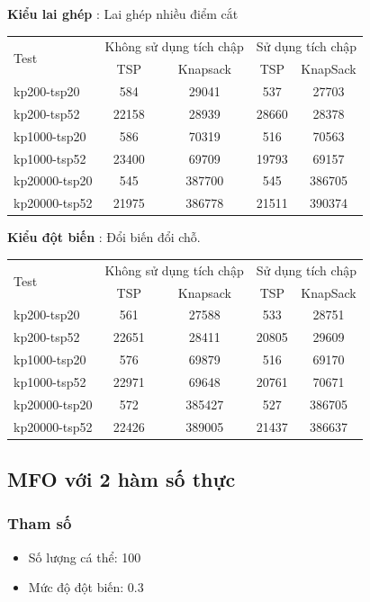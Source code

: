 \documentclass[a4paper,12pt]{report}
\begin{document}
\textbf{Kiểu lai ghép} : Lai ghép nhiều điểm cắt

\begin{longtable}{|l |c |c |c |c|}
\hline
\multirow{2}{*}{Test} 
& \multicolumn{2}{c|}{Không sử dụng tích chập} &\multicolumn{2}{|c|}{Sử dụng tích chập} \\
\cline{2-5}
&TSP & Knapsack & TSP & KnapSack \\
\hline
kp200-tsp20  & 584&29041 &537 &27703 
\\ \hline
kp200-tsp52&22158 &28939&28660 &28378 \\ \hline
kp1000-tsp20 &586&70319&516&70563 \\ \hline
kp1000-tsp52 &23400&69709&19793&69157 \\ \hline
kp20000-tsp20 &545&387700&545 &386705 \\ \hline
kp20000-tsp52 &21975&386778&21511& 390374\\ \hline
\end{longtable}
\textbf{Kiểu đột biến} : Đổi biến đổi chỗ.

\begin{longtable}{|l |c |c |c |c|}
\hline
\multirow{2}{*}{Test} 
& \multicolumn{2}{c|}{Không sử dụng tích chập} &\multicolumn{2}{|c|}{Sử dụng tích chập} \\
\cline{2-5}
&TSP & Knapsack & TSP & KnapSack \\
\hline
kp200-tsp20  & 561&27588 &533 &28751 
\\ \hline
kp200-tsp52&22651 &28411&20805 &29609 \\ \hline
kp1000-tsp20 &576&69879&516&69170 \\ \hline
kp1000-tsp52 &22971&69648&20761&70671 \\ \hline
kp20000-tsp20 &572&385427&527 &386705 \\ \hline

kp20000-tsp52 &22426 & 389005 & 21437 & 386637\\
\hline
\end{longtable}


\subsection{MFO với 2 hàm số thực}
\subsubsection{Tham số}
\begin{itemize}
\item Số lượng cá thể: 100
\item Mức độ đột biến: 0.3
\end{itemize}
\end{document}
